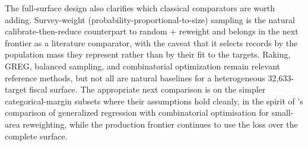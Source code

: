The full-surface design also clarifies which classical comparators are worth adding. Survey-weight
(probability-proportional-to-size) sampling is the natural calibrate-then-reduce counterpart to random +
reweight and belongs in the next frontier as a literature comparator, with the caveat that it selects
records by the population mass they represent rather than by their fit to the targets. Raking, GREG,
balanced sampling, and combinatorial optimization remain relevant reference methods, but not all are
natural baselines for a heterogeneous
32{,}633-target fiscal surface. The appropriate next comparison is on the simpler categorical-margin
subsets where their assumptions hold cleanly, in the spirit of \citet{tanton2014co}'s comparison of
generalized regression with combinatorial optimisation for small-area reweighting, while the production
frontier continues to use the \populace{} loss over the complete surface.

